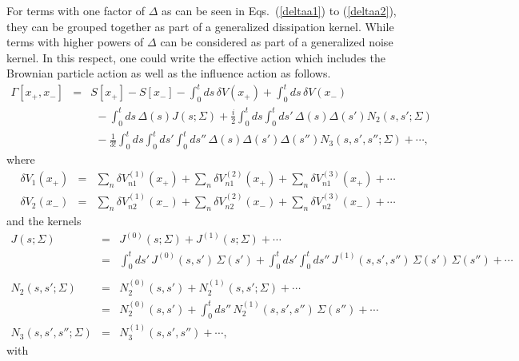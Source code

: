\documentclass[%
amssymb,preprint,preprintnumbers,nofootinbib,superscriptaddress]{revtex4}
\begin{document}
For terms with one factor of $\Delta$ as can be seen in Eqs.~(\ref{deltaa1}) to (\ref{deltaa2}), they can be grouped together as part of a generalized dissipation kernel. While terms with higher powers of $\Delta$ can be considered as part of a generalized noise kernel. In this respect, one could write the effective action which includes the Brownian particle action as well as the influence action as follows. %
\begin{eqnarray}\label{effact}
\Gamma[x_{+},x_{-}]&=&S[x_{+}]-S[x_{-}]-\int_{0}^{t}ds\,\delta V(x_{+})+\int_{0}^{t}ds\,\delta V(x_{-})\nonumber\\
&&\ \ -\int_{0}^{t}ds\,\Delta(s)J(s;\Sigma)
+\frac{i}{2}\int_{0}^{t}ds\int_{0}^{t}ds'\,\Delta(s)\Delta(s')N_{2}(s,s';\Sigma)\nonumber\\
&&\ \ -\frac{1}{3!}\int_{0}^{t}ds\int_{0}^{t}ds'\int_{0}^{t}ds''\,\Delta(s)\Delta(s')\Delta(s'')N_{3}(s,s',s'';\Sigma)+\cdots,
\end{eqnarray}
where 
\begin{eqnarray}
    \delta V_{1}(x_{+})&=&\sum_{n}\delta V_{n1}^{(1)}(x_{+})+\sum_{n}\delta V_{n1}^{(2)}(x_{+})+\sum_{n}\delta V_{n1}^{(3)}(x_{+})+\cdots\\
    \delta V_{2}(x_{-})&=&\sum_{n}\delta V_{n2}^{(1)}(x_{-})+\sum_{n}\delta V_{n2}^{(2)}(x_{-})+\sum_{n}\delta V_{n2}^{(3)}(x_{-})+\cdots
\end{eqnarray}
and the kernels
\begin{eqnarray}
J(s;\Sigma)&=&J^{(0)}(s;\Sigma)+J^{(1)}(s;\Sigma)+\cdots\nonumber\\
&=&\int_{0}^{t}ds'\,J^{(0)}(s,s')\,\Sigma(s')+\int_{0}^{t}ds'\int_{0}^{t}ds''\,J^{(1)}(s,s',s'')\,\Sigma(s')\,\Sigma(s'')+\cdots\nonumber\\  \label{Jkernel}\\
N_{2}(s,s';\Sigma)&=&N_{2}^{(0)}(s,s')+N_{2}^{(1)}(s,s';\Sigma)+\cdots\nonumber\\
&=&N^{(0)}_{2}(s,s')+\int_{0}^{t}ds''\,N^{(1)}_{2}(s,s',s'')\,\Sigma(s'')+\cdots\\
N_{3}(s,s',s'';\Sigma)&=&N_{3}^{(1)}(s,s',s'')+\cdots,\label{kernels}
\end{eqnarray}
with
\end{document}

